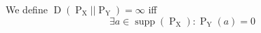 We define $\operatorname{D}(\operatorname{P}_{\operatorname{X}}  || \operatorname{P}_{\operatorname{Y}} ) = \infty$ iff 
$$\exists a \in \operatorname{supp}(\operatorname{P}_{\operatorname{X}} ) : \operatorname{P}_{\operatorname{Y}}(a) = 0$$

